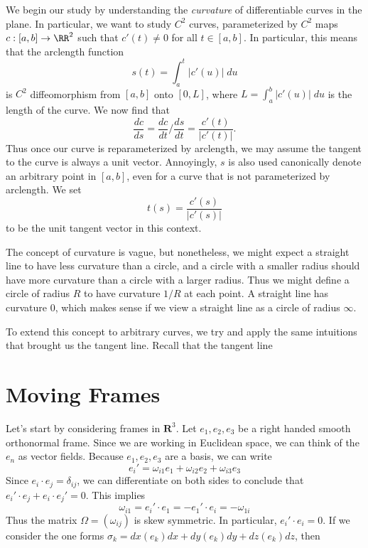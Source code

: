 We begin our study by understanding the \emph{curvature} of differentiable curves in the plane. In particular, we want to study $C^2$ curves, parameterized by $C^2$ maps $c: [a,b] \to \RR^2$ such that $c'(t) \neq 0$ for all $t \in [a,b]$. In particular, this means that the arclength function
%
\[ s(t) = \int_a^t |c'(u)|\; du \]
%
is $C^2$ diffeomorphism from $[a,b]$ onto $[0,L]$, where $L = \int_a^b |c'(u)|\; du$ is the length of the curve. We now find that
%
\[ \frac{dc}{ds} = \frac{dc}{dt} \bigg/ \frac{ds}{dt} = \frac{c'(t)}{|c'(t)|}. \]
%
Thus once our curve is reparameterized by arclength, we may assume the tangent to the curve is always a unit vector. Annoyingly, $s$ is also used canonically denote an arbitrary point in $[a,b]$, even for a curve that is not parameterized by arclength. We set
%
\[ t(s) = \frac{c'(s)}{|c'(s)|} \]
%
to be the unit tangent vector in this context.

The concept of curvature is vague, but nonetheless, we might expect a straight line to have less curvature than a circle, and a circle with a smaller radius should have more curvature than a circle with a larger radius. Thus we might define a circle of radius $R$ to have curvature $1/R$ at each point. A straight line has curvature $0$, which makes sense if we view a straight line as a circle of radius $\infty$.

To extend this concept to arbitrary curves, we try and apply the same intuitions that brought us the tangent line. Recall that the tangent line 




\chapter{Moving Frames}

Let's start by considering frames in $\mathbf{R}^3$. Let $e_1, e_2, e_3$ be a right handed smooth orthonormal frame. Since we are working in Euclidean space, we can think of the $e_n$ as vector fields. Because $e_1, e_2, e_3$ are a basis, we can write
%
\[ e_i' = \omega_{i1} e_1 + \omega_{i2} e_2 + \omega_{i3} e_3 \]
%
Since $e_i \cdot e_j = \delta_{ij}$, we can differentiate on both sides to conclude that $e_i' \cdot e_j + e_i \cdot e_j' = 0$. This implies
%
\[ \omega_{i1} = e_i' \cdot e_1 = - e_1' \cdot e_i = - \omega_{1i} \]
%
Thus the matrix $\Omega = (\omega_{ij})$ is skew symmetric. In particular, $e_i' \cdot e_i = 0$. If we consider the one forms $\sigma_k = dx(e_k) dx + dy(e_k) dy + dz(e_k) dz$, then











